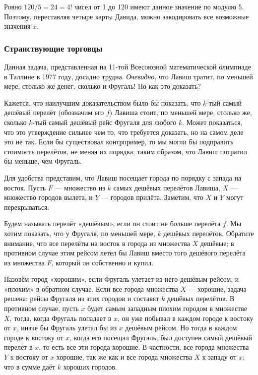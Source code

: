 Ровно $120/5 = 24 = 4!$ чисел от 1 до 120 имеют данное значение по модулю 5.
Поэтому, переставляя четыре карты Давида, можно закодировать все возможные значения $x$.\heart

\subsubsection*{Странствующие торговцы} %

Данная задача, представленная на 11-той Всесоюзной математической олимпиаде в Таллине в 1977 году, досадно трудна. %
\emph{Очевидно}, что Лавиш тратит, по меньшей мере, столько же денег, сколько и Фругаль!
Но как это доказать? %

Кажется, что наилучшим доказательством было бы показать, что $k$-тый самый
дешёвый перелёт (обозначим его $f$) Лавиша стоит, по меньшей мере, столько же, сколько $k$-тый самый дешёвый рейс Фругаля для любого $k$.
Может показаться, что это утверждение сильнее чем то, что требуется доказать, но на самом деле это не так.
Если бы существовал контрпример, то мы могли бы подправить стоимость перелётов, не меняя их порядка, таким образом, что Лавиш потратил бы меньше, чем Фругаль.

Для удобства представим, что Лавиш посещает города по порядку с запада на восток.
Пусть $F$ --- множество из $k$ самых дешёвых перелётов Лавиша, $X$ --- множество городов вылета, и $Y$ --- городов прилёта.
Заметим, что $X$ и $Y$ могут перекрываться.

Будем называть перелёт «дешёвым», если он стоит не больше перелёта $f$.
Мы хотим показать, что у Фругаля, по меньшей мере, $k$ дешёвых перелётов.
Обратите внимание, что все перелёты на восток в города из множества $X$ дешёвые; в противном случае этим рейсом летел бы Лавиш вместо того дешёвого перелёта из множества $F$, который он собственно и купил.

Назовём город «хорошим», если Фругаль улетает из него дешёвым рейсом, и «плохим» в обратном случае.
Если все города множества $X$ --- хорошие, задача решена: рейсы Фругаля из этих городов и составят $k$ дешёвых перелётов.
В противном случае, пусть $x$ будет самым западным плохим городом в множестве $X$, тогда, когда Фругаль попадает в $x$, он уже побывал в каждом городе к востоку от $x$, иначе бы Фругаль улетал бы из $x$ дешёвым рейсом.
Но тогда в каждом городе к востоку от $x$, когда его посещал Фругаль, был доступен самый дешёвый перелёт в $x$, то есть все эти города хорошие.
В частности, все города множества $Y$ к востоку от $x$ хорошие, так же как и все города множества $X$ к западу от $x$; что в сумме даёт $k$ хороших городов.
\heart


